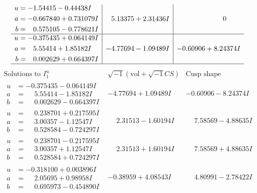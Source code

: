 \documentclass[1p]{elsarticle_modified}
\theoremstyle{definition}
\newcommand{\I}{\sqrt{-1}}
\begin{document}
$$\begin{array}{c|c|c}
\begin{aligned}
u &= -1.54415 - 0.44438 I \\
a &= -0.667840 + 0.731079 I \\
b &= \phantom{-}0.575105 - 0.778621 I\end{aligned}
 & \phantom{-}5.13375 + 2.31436 I & \phantom{-0.000000 } 0 \\ \hline\begin{aligned}
u &= -0.375435 + 0.064149 I \\
a &= \phantom{-}5.55414 + 1.85182 I \\
b &= \phantom{-}0.002629 + 0.664397 I\end{aligned}
 & -4.77694 - 1.09489 I & -0.60906 + 8.24374 I\\
 \hline 
 \end{array}$$\newpage$$\begin{array}{c|c|c}  
\text{Solutions to }I^u_{1}& \I (\text{vol} + \sqrt{-1}CS) & \text{Cusp shape}\\
 \hline 
\begin{aligned}
u &= -0.375435 - 0.064149 I \\
a &= \phantom{-}5.55414 - 1.85182 I \\
b &= \phantom{-}0.002629 - 0.664397 I\end{aligned}
 & -4.77694 + 1.09489 I & -0.60906 - 8.24374 I \\ \hline\begin{aligned}
u &= \phantom{-}0.238701 + 0.217595 I \\
a &= \phantom{-}3.00357 - 1.12547 I \\
b &= \phantom{-}0.528584 - 0.724297 I\end{aligned}
 & \phantom{-}2.31513 - 1.60194 I & \phantom{-}7.58569 - 4.88635 I \\ \hline\begin{aligned}
u &= \phantom{-}0.238701 - 0.217595 I \\
a &= \phantom{-}3.00357 + 1.12547 I \\
b &= \phantom{-}0.528584 + 0.724297 I\end{aligned}
 & \phantom{-}2.31513 + 1.60194 I & \phantom{-}7.58569 + 4.88635 I \\ \hline\begin{aligned}
u &= -0.318100 + 0.003896 I \\
a &= \phantom{-}2.05695 + 0.98958 I \\
b &= \phantom{-}0.695973 - 0.454890 I\end{aligned}
 & -0.38959 + 4.08543 I & \phantom{-}4.80991 - 2.78422 I \\ \hline\begin{aligned}

\end{aligned}
\end{array}$$
\end{document}
